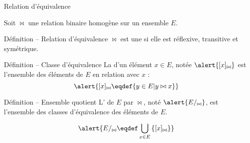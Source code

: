 
\begingroup

\begin{frame}{Relation d'équivalence}
  \small 

  Soit $\bowtie$ une relation binaire homogène sur un ensemble $E$.
  \begin{block}{Définition -- Relation d'équivalence}
    $\bowtie$ est une  si elle est \alert{réflexive}, \alert{transitive} et \alert{symétrique}.
  \end{block}

  \begin{block}{Définition -- Classe d'équivalence}
    La  d'un élément $x \in E$, notée $\alert{[x]_{\bowtie}}$ est l'ensemble des éléments de $E$ en relation avec $x$ :
    $$\alert{[x]_{\bowtie} \eqdef \{y\in E | y \bowtie x\}}$$
  \end{block}

  \begin{block}{Définition -- Ensemble quotient}
    L' de $E$ par $\bowtie$, noté $\alert{E/_{\bowtie}}$, est l'ensemble des classes d'équivalence des éléments de $E$.

    $$\alert{ E/_{\bowtie} \eqdef \bigcup_{x\in E}\left\{[x]_{\bowtie}\right\}}$$
  \end{block}
\end{frame}

\endgroup
